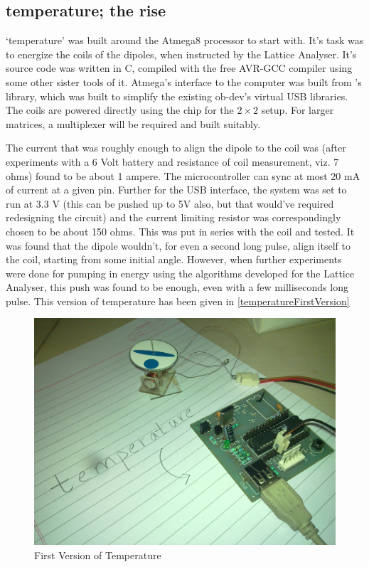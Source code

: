 	\subsection{temperature; the rise}
		`temperature' was built around the Atmega8 processor to start with. It's task was to energize the coils of the dipoles, when instructed by the Lattice Analyser. It's source code was written in C, compiled with the free AVR-GCC compiler using some other sister tools of it. Atmega's interface to the computer was built from \myProf's library, which was built to simplify the existing ob-dev's virtual USB libraries. The coils are powered directly using the chip for the $2\times 2$ setup. For larger matrices, a multiplexer will be required and built suitably.
		\par
		The current that was roughly enough to align the dipole to the coil was (after experiments with a 6 Volt battery and resistance of coil measurement, viz. 7 ohms) found to be about 1 ampere. The microcontroller can sync at most 20 mA of current at a given pin. Further for the USB interface, the system was set to run at 3.3 V (this can be pushed up to 5V also, but that would've required redesigning the circuit) and the current limiting resistor was correspondingly chosen to be about 150 ohms. This was put in series with the coil and tested. It was found that the dipole wouldn't, for even a second long pulse, align itself to the coil, starting from some initial angle. However, when further experiments were done for pumping in energy using the algorithms developed for the Lattice Analyser, this push was found to be enough, even with a few milliseconds long pulse. This version of temperature has been given in \autoref{temperatureFirstVersion}
		\par
		\begin{figure}[bth]
			\begin{center}
				\includegraphics[width=0.85\linewidth]{gfx/temperature.jpg}
			\end{center}
		\caption[First Version of Temperature]{First Version of Temperature}
		\label{temperatureFirstVersion}
		\end{figure}
